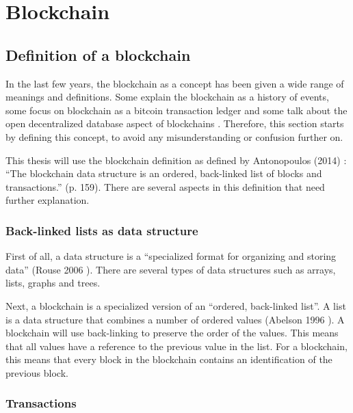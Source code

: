 \section{Blockchain}

\subsection{Definition of a blockchain}

\iffalse
todo: 
- different interpretations of blockchain
- reread and remove weird references
\fi

In the last few years, the blockchain as a concept has been given a wide range of meanings and definitions. Some explain the blockchain as a history of events, some focus on blockchain as a bitcoin transaction ledger and some talk about the open decentralized database aspect of blockchains \cite{blockchain-multiple-definitions}. Therefore, this section starts by defining this concept, to avoid any misunderstanding or confusion further on.

This thesis will use the blockchain definition as defined by Antonopoulos (2014) \cite{antonopoulos:2014}: ``The blockchain data structure is an ordered, back-linked list of blocks and transactions.'' (p. 159). There are several aspects in this definition that need further explanation.

\subsubsection{Back-linked lists as data structure}

First of all, a data structure is a ``specialized format for organizing and storing data'' (Rouse 2006 \cite{data-structure}). There are several types of data structures such as arrays, lists, graphs and trees.

Next, a blockchain is a specialized version of an ``ordered, back-linked list''. A list is a data structure that combines a number of ordered values (Abelson 1996 \cite{abelson:1996}). A blockchain will use back-linking to preserve the order of the values. This means that all values have a reference to the previous value in the list. For a blockchain, this means that every block in the blockchain contains an identification of the previous block.

\subsubsection{Transactions}

